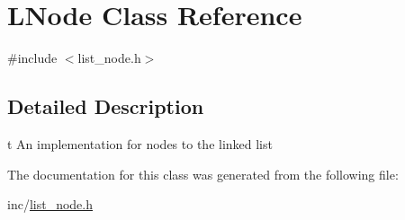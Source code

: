 \hypertarget{class_l_node}{}\section{L\+Node Class Reference}
\label{class_l_node}


{\ttfamily \#include $<$list\+\_\+node.\+h$>$}



\subsection{Detailed Description}
t An implementation for nodes to the linked list 

The documentation for this class was generated from the following file\+:\begin{DoxyCompactItemize}
\item 
inc/\hyperlink{list__node_8h}{list\+\_\+node.\+h}\end{DoxyCompactItemize}
